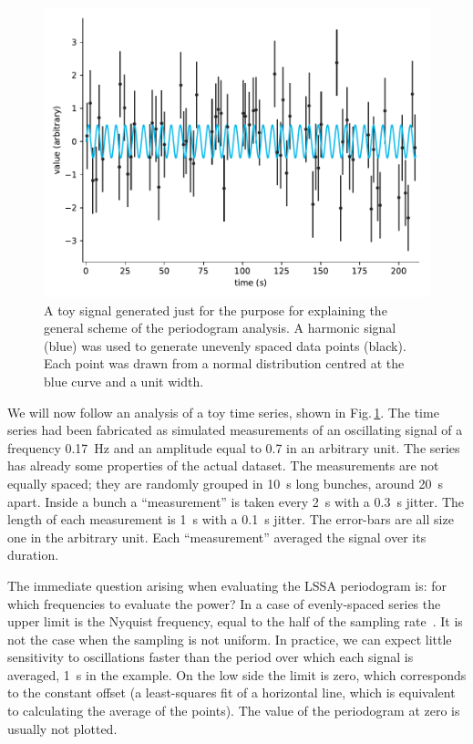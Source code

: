 \begin{figure}
  \centering \includegraphics[width=\linewidth]{gfx/axions/basic_signal.pdf}
  \caption{A toy signal generated just for the purpose for explaining the general scheme of the periodogram analysis. A harmonic signal (blue) was used to generate unevenly spaced data points (black). Each point was drawn from a normal distribution centred at the blue curve and a unit width.}\label{fig:basic_signal}
\end{figure}

We will now follow an analysis of a toy time series, shown in Fig.\,\ref{fig:basic_signal}. The time series had been fabricated as simulated measurements of an oscillating signal of a frequency \SI{0.17}{\hertz} and an amplitude equal to \num{0.7} in an arbitrary unit.
The series has already some properties of the actual dataset. The measurements are not equally spaced; they are randomly grouped in \SI{10}{\second} long bunches, around \SI{20}{\second} apart. Inside a bunch a ``measurement'' is taken every \SI{2}{\second} with a \SI{0.3}{\second} jitter. The length of each measurement is \SI{1}{\second} with a \SI{0.1}{\second} jitter. The error-bars are all size one in the arbitrary unit. Each ``measurement'' averaged the signal over its duration.

The immediate question arising when evaluating the LSSA periodogram is: for which frequencies to evaluate the power? In a case of evenly-spaced series the upper limit is the Nyquist frequency, equal to the half of the sampling rate~\cite{Shannon1949}.
It is not the case when the sampling is not uniform. In practice, we can expect little sensitivity to oscillations faster than the period over which each signal is averaged, \SI{1}{\second} in the example. On the low side the limit is zero, which corresponds to the constant offset (a least-squares fit of a horizontal line, which is equivalent to calculating the average of the points). The value of the periodogram at zero is usually not plotted.


